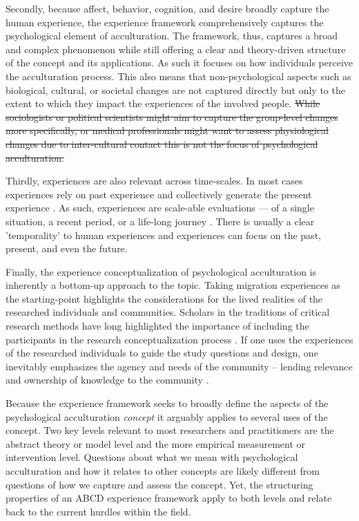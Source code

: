 \documentclass[nobib]{tufte-handout}
\begin{document}
Secondly, because affect, behavior, cognition, and desire broadly capture the human experience, the experience framework comprehensively captures the psychological element of acculturation. The framework, thus, captures a broad and complex phenomenon while still offering a clear and theory-driven structure of the concept and its applications. 
As such it focuses on how individuals perceive the acculturation process. This also means that non-psychological aspects such as biological, cultural, or societal changes are not captured directly but only to the extent to which they impact the experiences of the involved people. \sout{While sociologists or political scientists might aim to capture the group-level changes more specifically, or medical professionals might want to assess physiological changes due to inter-cultural contact this is not the focus of psychological acculturation.} 

Thirdly, experiences are also relevant across time-scales. In most cases experiences rely on past experience and collectively generate the present experience \citep[also see][]{Husserl1959, Heidegger1867}. As such, experiences are scale-able evaluations --- of a single situation, a recent period, or a life-long journey \citep[e.g.,][]{Clewett2019}. There is usually a clear 'temporality' to human experiences and experiences can focus on the past, present, and even the future.

Finally, the experience conceptualization of psychological acculturation is inherently a bottom-up approach to the topic. Taking migration experiences as the starting-point highlights the considerations for the lived realities of the researched individuals and communities. Scholars in the traditions of critical research methods have long highlighted the importance of including the participants in the research conceptualization process \citep[e.g.,][]{Kovach2009}. If one uses the experiences of the researched individuals to guide the study questions and design, one inevitably emphasizes the agency and needs of the community -- lending relevance and ownership of knowledge to the community \citep[e.g., ][]{Schmidt2021}.

Because the experience framework seeks to broadly define the aspects of the psychological acculturation \textit{concept} it arguably applies to several uses of the concept. Two key levels relevant to most researchers and practitioners are the abstract theory or model level and the more empirical measurement or intervention level. Questions about what we mean with psychological acculturation and how it relates to other concepts are likely different from questions of how we capture and assess the concept. Yet, the structuring properties of an ABCD experience framework apply to both levels and relate back to the current hurdles within the field.
\end{document}
